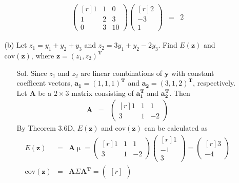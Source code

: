 \documentclass[12pt]{article} %
\begin{document}
\begin{enumerate}
\begin{enumerate}
\begin{enumerate}
\begin{eqnarray*}
					\begin{pmatrix}[r]
						1 & 1 & 0 \\
						1 & 2 & 3 \\
						0 & 3 & 10 
					\end{pmatrix}
					\begin{pmatrix}[r]
						 2 \\
							   -3 \\
						 1	
					\end{pmatrix}
					&=&2												
				\end{eqnarray*}
			\end{enumerate}
		\item[(b)] Let $z_{1}=y_{1}+y_{2}+y_{3}$ and $z_{2}=3y_{1}+y_{2}-2y_{3}$. 
		Find $E(\mathbf{z})$ and $\mathrm{cov(\mathbf{z})}$, where
		 $\mathbf{z}=(z_{1}, z_{2})^\mathbf{T}$
		 \begin{enumerate}
		 	\item[Sol.] Since $z_{1}$ and $z_{2}$ are linear combinations of 
		 	$\mathbf{y}$ with constant coefficent vectors, 
		 	$\mathbf{a_{1}}=(1,1,1)^\mathbf{T}$ and $\mathbf{a_{2}}=(3,1,2)^\mathbf{T}$, respectively.
		 	Let $\mathbf{A}$ be a $2 \times 3$ matrix consisting of $\mathbf{a_{1}^{T}}$
		 	and $\mathbf{a_{2}^{T}}$. Then 
		 	\begin{eqnarray*}
		 		\mathbf{A}&=&
				\begin{pmatrix}[r]
					1 & 1 &  1 \\
					3 & 1 & 		  -2 
				\end{pmatrix}		 		
		 	\end{eqnarray*}
		 	By Theorem 3.6D, $E(\mathbf{z})$ and $\mathrm{cov(\mathbf{z})}$
		 	can be calculated as
		 	\begin{eqnarray*}
		 	E(\mathbf{z})&=&\mathbf{A}\upmu=
		 	\begin{pmatrix}[r]
				1 & 1 &  1 \\
				3 & 1 & 		  -2 		 	
		 	\end{pmatrix}
		 	\begin{pmatrix}[r]
				 1 \\
					   -1 \\
				 3			 		
		 	\end{pmatrix}
		 	=
		 	\begin{pmatrix}[r]
				 3 \\
					   -4 		 		
		 	\end{pmatrix}\\
		 	\mathrm{cov}(\mathbf{z})&=&\mathbf{A}\Sigma\mathbf{A^{T}}=
		 	\begin{pmatrix}[r]

\end{pmatrix}
\end{eqnarray*}
\end{enumerate}
\end{enumerate}
\end{enumerate}
\end{document}
